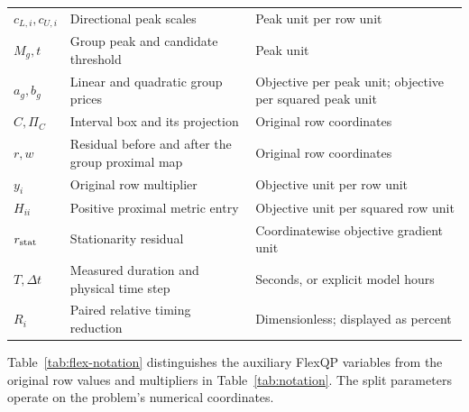 \begin{table}[htbp]
\begin{tabularx}{\textwidth}{@{}l>{\raggedright\arraybackslash}X>{\raggedright\arraybackslash}X@{}}
$c_{L,i},c_{U,i}$ & Directional peak scales & Peak unit per row unit\\
$M_g,t$ & Group peak and candidate threshold & Peak unit\\
$a_g,b_g$ & Linear and quadratic group prices & Objective per peak unit; objective per squared peak unit\\
$C,\Pi_C$ & Interval box and its projection & Original row coordinates\\
$r,w$ & Residual before and after the group proximal map & Original row coordinates\\
$y_i$ & Original row multiplier & Objective unit per row unit\\
$H_{ii}$ & Positive proximal metric entry & Objective unit per squared row unit\\
$r_{\rm stat}$ & Stationarity residual & Coordinatewise objective gradient unit\\
$T,\Delta t$ & Measured duration and physical time step & Seconds, or explicit model hours\\
$R_i$ & Paired relative timing reduction & Dimensionless; displayed as percent\\\bottomrule
\end{tabularx}
\end{table}

Table~\ref{tab:flex-notation} distinguishes the auxiliary FlexQP variables
from the original row values and multipliers in Table~\ref{tab:notation}.
The split parameters operate on the problem's numerical coordinates.

